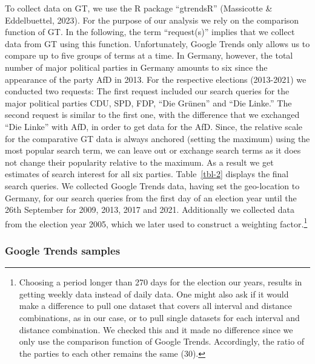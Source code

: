 \documentclass[
  letterpaper,
  DIV=11,
  numbers=noendperiod]{scrartcl}
\begin{document}
To collect data on GT, we use the R package ``gtrendsR'' (Massicotte \&
Eddelbuettel, 2023). For the purpose of our analysis we rely on the
comparison function of GT. In the following, the term ``request(s)''
implies that we collect data from GT using this function. Unfortunately,
Google Trends only allows us to compare up to ﬁve groups of terms at a
time. In Germany, however, the total number of major political parties
in Germany amounts to six since the appearance of the party AfD in 2013.
For the respective elections (2013-2021) we conducted two requests: The
ﬁrst request included our search queries for the major political parties
CDU, SPD, FDP, ``Die Grünen'' and ``Die Linke.'' The second request is
similar to the ﬁrst one, with the diﬀerence that we exchanged ``Die
Linke'' with AfD, in order to get data for the AfD. Since, the relative
scale for the comparative GT data is always anchored (setting the
maximum) using the most popular search term, we can leave out or
exchange search terms as it does not change their popularity relative to
the maximum. As a result we get estimates of search interest for all six
parties. Table~\ref{tbl-2} displays the final search queries. We
collected Google Trends data, having set the geo-location to Germany,
for our search queries from the first day of an election year until the
26th September for 2009, 2013, 2017 and 2021. Additionally we collected
data from the election year 2005, which we later used to construct a
weighting factor.\footnote{Choosing a period longer than 270 days for
  the election our years, results in getting weekly data instead of
  daily data. One might also ask if it would make a difference to pull
  one dataset that covers all interval and distance combinations, as in
  our case, or to pull single datasets for each interval and distance
  combination. We checked this and it made no difference since we only
  use the comparison function of Google Trends. Accordingly, the ratio
  of the parties to each other remains the same (30).}

\hypertarget{google-trends-samples}{%
\subsubsection{Google Trends samples}\label{google-trends-samples}}
\end{document}
